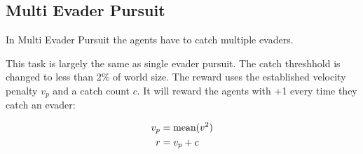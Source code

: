 \subsection{Multi Evader Pursuit}

In Multi Evader Pursuit the agents have to catch multiple evaders.\par

This task is largely the same as single evader pursuit. The catch threshhold is changed to less than 2\% of world size.
The reward uses the established velocity penalty $v_p$ and a catch count $c$. It will reward the agents with +1 every time they catch an evader:

\begin{equation} 
    \begin{aligned}
        v_p &= \textup{mean}(v^2)\\
        r &= v_p + c
    \end{aligned}
    \nonumber
\end{equation}